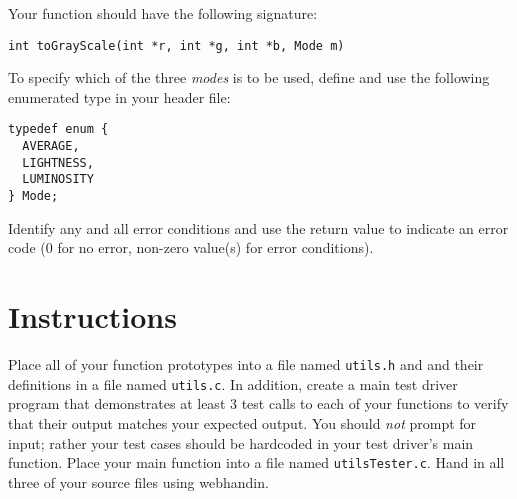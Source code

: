 \documentclass[12pt]{scrartcl}
\begin{document}
\begin{enumerate}
Your function should have the following signature:

\texttt{int toGrayScale(int *r, int *g, int *b, Mode m)}

To specify which of the three \emph{modes} is to be used, define
and use the following enumerated type in your header file:
\begin{verbatim}
typedef enum {
  AVERAGE,
  LIGHTNESS,
  LUMINOSITY
} Mode;
\end{verbatim}
Identify any and all error conditions and use the return value to indicate
an error code (0 for no error, non-zero value(s) for error conditions).

\end{enumerate}



\section*{Instructions}
	
Place all of your function prototypes into a file named \texttt{utils.h} and and their definitions in a
file named \texttt{utils.c}.  In addition, create a main test driver program that demonstrates at
least 3 test calls to each of your functions to verify that their output matches your expected
output.  You should \emph{not} prompt for input; rather your test cases should be hardcoded in
your test driver's main function.  Place your main function into a file named \texttt{utilsTester.c}.  
Hand in all three of your source files using webhandin.
\end{document}
